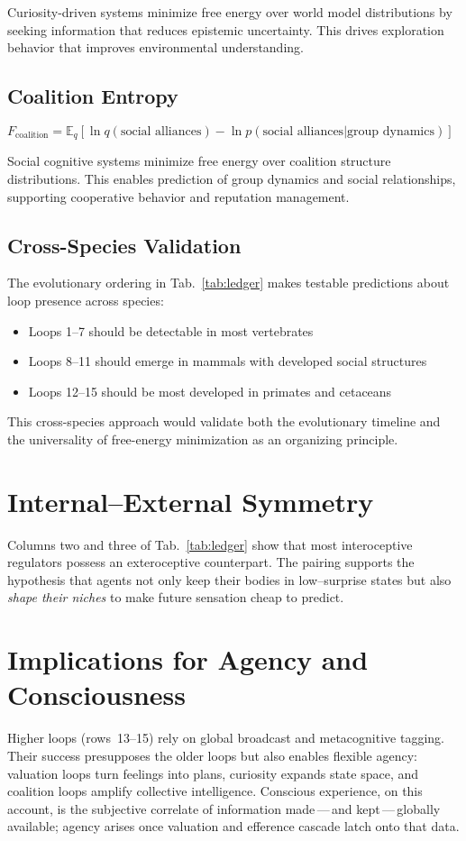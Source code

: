 \documentclass[10pt]{article}
\begin{document}
Curiosity-driven systems minimize free energy over world model distributions by seeking information that reduces epistemic uncertainty. This drives exploration behavior that improves environmental understanding.

\subsection{Coalition Entropy}
$F_{\text{coalition}} = \mathbb{E}_q[\ln q(\text{social alliances}) - \ln p(\text{social alliances}|\text{group dynamics})]$

Social cognitive systems minimize free energy over coalition structure distributions. This enables prediction of group dynamics and social relationships, supporting cooperative behavior and reputation management.

\subsection{Cross-Species Validation}
The evolutionary ordering in Tab.~\ref{tab:ledger} makes testable predictions about loop presence across species:
\begin{itemize}
\item Loops 1--7 should be detectable in most vertebrates
\item Loops 8--11 should emerge in mammals with developed social structures  
\item Loops 12--15 should be most developed in primates and cetaceans
\end{itemize}

This cross-species approach would validate both the evolutionary timeline and the universality of free-energy minimization as an organizing principle.

\section{Internal--External Symmetry}
Columns two and three of Tab.~\ref{tab:ledger} show that most interoceptive regulators possess an exteroceptive counterpart.  
The pairing supports the hypothesis that agents not only keep their bodies in low--surprise states 
but also \emph{shape their niches} to make future sensation cheap to predict.

\section{Implications for Agency and Consciousness}
Higher loops (rows~13--15) rely on global broadcast and metacognitive tagging.  
Their success presupposes the older loops but also enables flexible agency: valuation loops turn feelings into plans, 
curiosity expands state space, and coalition loops amplify collective intelligence.  
Conscious experience, on this account, is the subjective correlate of information made\,---\,and kept\,---\,globally available; 
agency arises once valuation and efference cascade latch onto that data.  
\end{document}
